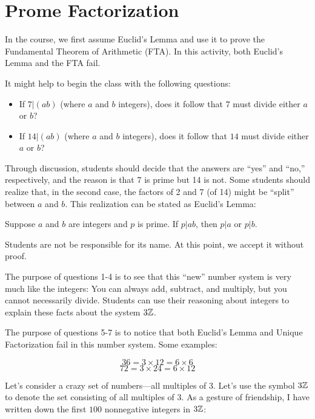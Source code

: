 \newpage
\section{Prome Factorization}\label{A:Prome}

\begin{teachingnote}
In the course, we first assume Euclid's Lemma and use it to prove the Fundamental Theorem of Arithmetic (FTA).  In this activity, both Euclid's Lemma and the FTA fail.

It might help to begin the class with the following questions:  
\begin{itemize}
\item If $7|(ab)$ (where $a$ and $b$ integers), does it follow that $7$ must divide either $a$ or $b$? 
\item If $14|(ab)$ (where $a$ and $b$ integers), does it follow that $14$ must divide either $a$ or $b$? 
\end{itemize}

Through discussion, students should decide that the answers are ``yes'' and ``no,'' respectively, and the reason is that 7 is prime but 14 is not.  Some students should realize that, in the second case, the factors of 2 and 7 (of 14) might be ``split'' between $a$ and $b$.  This realization can be stated as Euclid's Lemma:  

\begin{center}
Suppose $a$ and $b$ are integers and $p$ is prime.  If $p|ab$, then $p|a$ or $p|b$.  
\end{center}

Students are not be responsible for its name.  At this point, we accept it without proof.  

The purpose of questions 1-4 is to see that this ``new'' number system is very much like the integers:  You can always add, subtract, and multiply, but you cannot necessarily divide.  Students can use their reasoning about integers to explain these facts about the system $3\mathbb Z$.  

The purpose of questions 5-7 is to notice that both Euclid's Lemma and Unique Factorization fail in this number system.  Some examples:  

$$36 = 3\times 12 = 6\times 6$$
$$72 = 3\times 24=6\times 12$$
\end{teachingnote}


Let's consider a crazy set of numbers---all multiples of $3$. Let's
use the symbol $3\mathbb Z$ to denote the set consisting of all multiples of
$3$. As a gesture of friendship, I have written down the first $100$
nonnegative integers in $3\mathbb Z$:

